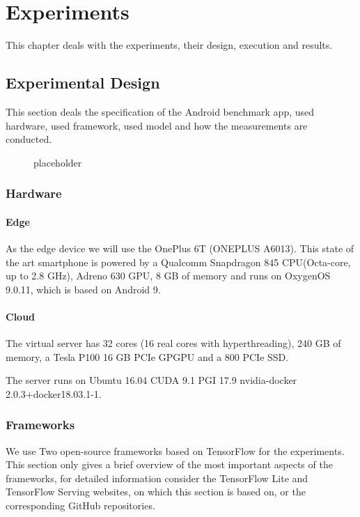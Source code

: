 \chapter{Experiments}
\label{chap:experiments}
This chapter deals with the experiments, their design, execution and results.
\section{Experimental Design}
This section deals the specification of the Android benchmark app, used hardware, used framework, used model and how the measurements are conducted. 
\begin{figure}[H]
\centering

\caption{placeholder}
\label{fig:cloud}
\end{figure}


\subsection{Hardware}
\subsubsection{Edge}
As the edge device we will use the OnePlus 6T (ONEPLUS A6013). This state of the art smartphone is powered by a Qualcomm Snapdragon 845 CPU(Octa-core, up to 2.8 GHz), Adreno 630 GPU, 8 GB of memory and runs on OxygenOS 9.0.11, which is based on Android 9.
\subsubsection{Cloud}
The virtual server has 32 cores (16 real cores with hyperthreading), 240 GB of memory, a Tesla P100 16 GB PCIe GPGPU and a 800 PCIe SSD.

The server runs on Ubuntu 16.04 CUDA 9.1 PGI 17.9 nvidia-docker 2.0.3+docker18.03.1-1.
\subsection{Frameworks}
We use Two open-source frameworks based on TensorFlow for the experiments.
This section only gives a brief overview of the most important aspects of the frameworks, for detailed information consider the TensorFlow Lite\cite{tfLite}  and TensorFlow Serving\cite{tfServing} websites, on which this section is based on, or the corresponding GitHub repositories.
